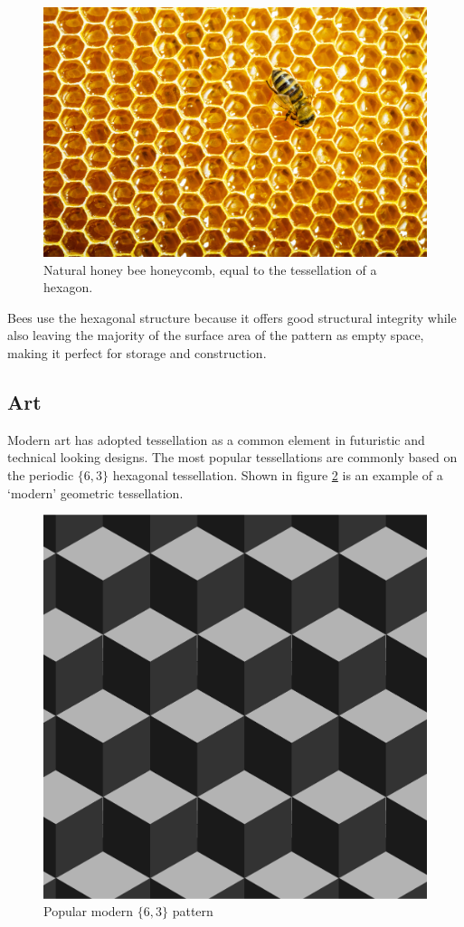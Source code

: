 \documentclass[12pt,letterpaper]{article}
\begin{document}
\begin{figure}[H]
    \begin{center}
        \includegraphics[width=.6\linewidth]{honeycomb}
        \caption{Natural honey bee honeycomb, equal to the tessellation of a hexagon.}
        \label{fig:bee}
    \end{center}
\end{figure}

Bees use the hexagonal structure because it offers good structural integrity while also leaving the majority of the surface area of the pattern as empty space, making it perfect for storage and construction. 

\subsection{Art}
Modern art has adopted tessellation as a common element in futuristic and technical looking designs. The most popular tessellations are commonly based on the periodic $\{6,3\}$ hexagonal tessellation. Shown in figure \ref{fig:modern} is an example of a `modern' geometric tessellation. 

\begin{figure}[H]
    \begin{center}
        \includegraphics[width=.6\linewidth]{modern-tes}
        \caption{Popular modern $\{6,3\}$ pattern}
        \label{fig:modern}
    \end{center}
\end{figure}
\end{document}

